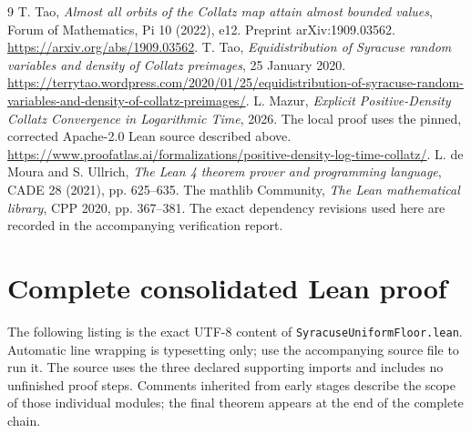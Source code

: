 \documentclass[11pt,a4paper]{article}
\theoremstyle{definition}\newtheorem{definition}[theorem]{Definition}
\theoremstyle{remark}\newtheorem{remark}[theorem]{Remark}
\newcommand{\code}[1]{{\small\nolinkurl{#1}}}
\begin{document}
\begin{thebibliography}{9}
 T. Tao, \emph{Almost all orbits of the Collatz map attain
almost bounded values}, Forum of Mathematics, Pi 10 (2022), e12.
Preprint arXiv:1909.03562. \url{https://arxiv.org/abs/1909.03562}.
 T. Tao, \emph{Equidistribution of Syracuse random variables
and density of Collatz preimages}, 25 January 2020.
\url{https://terrytao.wordpress.com/2020/01/25/equidistribution-of-syracuse-random-variables-and-density-of-collatz-preimages/}.
 L. Mazur, \emph{Explicit Positive-Density Collatz Convergence
in Logarithmic Time}, 2026. The local proof uses the pinned, corrected
Apache-2.0 Lean source described above.
\url{https://www.proofatlas.ai/formalizations/positive-density-log-time-collatz/}.
 L. de Moura and S. Ullrich, \emph{The Lean 4 theorem prover
and programming language}, CADE 28 (2021), pp. 625--635.
 The mathlib Community, \emph{The Lean mathematical library},
CPP 2020, pp. 367--381. The exact dependency revisions used here are recorded
in the accompanying verification report.
\end{thebibliography}

\clearpage\appendix
\section{Complete consolidated Lean proof}\label{appendix}
The following listing is the exact UTF-8 content of
\code{SyracuseUniformFloor.lean}. Automatic line wrapping is typesetting
only; use the accompanying source file to run it. The source uses the
three declared supporting imports and includes no unfinished proof steps.
Comments inherited from early stages describe the scope of those individual
modules; the final theorem appears at the end of the complete chain.
\end{document}
